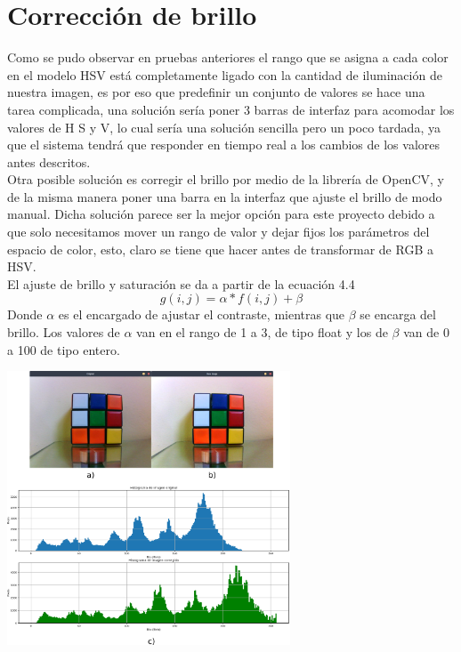 \section{Corrección de brillo}
Como se pudo observar en pruebas anteriores el rango que se asigna a cada color en el modelo HSV está
completamente ligado con la cantidad de iluminación de nuestra imagen, es por eso que predefinir
un conjunto de valores se hace una tarea complicada, una solución sería poner 3 barras de interfaz
para acomodar los valores de H S y V, lo cual sería una solución sencilla pero un poco tardada, ya que
el sistema tendrá que responder en tiempo real a los cambios de los valores antes descritos.\\
Otra posible solución es corregir el brillo por medio de la librería de OpenCV,
y de la misma manera poner una barra en la interfaz que ajuste el brillo de modo manual. Dicha solución
parece ser la mejor opción para este proyecto debido a que solo necesitamos mover un rango de valor y dejar
fijos los parámetros del espacio de color, esto, claro se tiene que hacer antes de transformar de RGB
a HSV.\\
El ajuste de brillo y saturación se da a partir de la ecuación 4.4
\begin{equation}
	g(i,j) = \alpha * f(i,j) + \beta
\end{equation}
Donde $\alpha$ es el encargado de ajustar el contraste, mientras que $\beta$ se encarga del brillo.
Los valores de $\alpha$ van en el rango de 1 a 3, de tipo float y los de $\beta$ van de 0 a 100 de tipo entero.
\begin{center}
	\includegraphics[width=0.63\textwidth]{Contenido/Cuerpo/Capitulo4/Fig19.eps}
	\label{Fig9}
\end{center}
